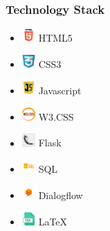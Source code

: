 \documentclass[14pt]{beamer}
\begin{document}
\begin{frame}
    \frametitle{Technology Stack}
    \noindent
    \begin{itemize}
        \item [] \includegraphics[width=0.2in, height=0.2in]{./logos/html.png} HTML5 \\
            \pause
        \item [] \includegraphics[width=0.2in, height=0.2in]{./logos/css.png} CSS3 \\
            \pause
        \item [] \includegraphics[width=0.2in, height=0.2in]{./logos/java.png} Javascript \\
            \pause
        \item [] \includegraphics[width=0.2in, height=0.2in]{./logos/w3.png} W3.CSS \\
            \pause
        \item [] \includegraphics[width=0.2in, height=0.2in]{./logos/flask.jpg} Flask \\
            \pause
        \item [] \includegraphics[width=0.2in, height=0.2in]{./logos/sql.jpg} SQL \\
            \pause
        \item [] \includegraphics[width=0.2in, height=0.2in]{./logos/dialogflow.jpg} Dialogflow \\
            \pause
        \item [] \includegraphics[width=0.2in, height=0.2in]{./logos/latex.png} LaTeX \\
    \end{itemize}
\noindent
\end{frame}
\end{document}
